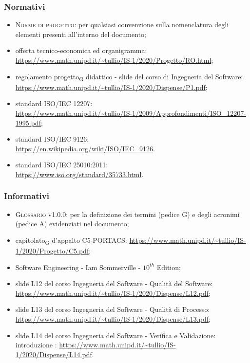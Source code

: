     \subsubsection{Normativi}
    \begin{itemize}
    	\item \textsc{Norme di progetto}: per qualsiasi convenzione sulla nomenclatura degli elementi presenti all'interno del documento;
    	\item offerta tecnico-economica ed organigramma: \newline  \url{https://www.math.unipd.it/~tullio/IS-1/2020/Progetto/RO.html};
    	\item regolamento \gls{progetto}\textsubscript{G} didattico - slide del corso di Ingegneria del Software: \newline \url{https://www.math.unipd.it/~tullio/IS-1/2020/Dispense/P1.pdf};
        \item standard ISO/IEC 12207:\\ \url{https://www.math.unipd.it/~tullio/IS-1/2009/Approfondimenti/ISO_12207-1995.pdf};
        \item standard ISO/IEC 9126:\\
        \url{https://en.wikipedia.org/wiki/ISO/IEC_9126}.
        \item standard ISO/IEC 25010:2011:\\
        \url{https://www.iso.org/standard/35733.html}.
    \end{itemize}

    \subsubsection{Informativi}
    \begin{itemize}
        \item \textsc{Glossario v1.0.0}: per la definizione dei termini (pedice G) e degli acronimi (pedice A) evidenziati nel documento;
    	\item \gls{capitolato}\textsubscript{G} d'appalto C5-PORTACS: \newline
    	\url{https://www.math.unipd.it/~tullio/IS-1/2020/Progetto/C5.pdf};
       	\item Software Engineering - Iam Sommerville - $10^{th}$ Edition;
        \item slide L12 del corso Ingegneria del Software - Qualità del Software:\newline
        \url{https://www.math.unipd.it/~tullio/IS-1/2020/Dispense/L12.pdf};
        \item slide L13 del corso Ingegneria del Software - Qualità di Processo:\newline
        \url{https://www.math.unipd.it/~tullio/IS-1/2020/Dispense/L13.pdf};
        \item slide L14 del corso Ingegneria del Software - Verifica e Validazione: introduzione :\newline
        \url{https://www.math.unipd.it/~tullio/IS-1/2020/Dispense/L14.pdf}.
    \end{itemize}